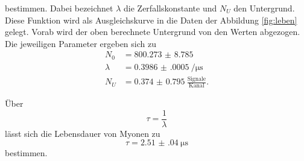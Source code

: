 bestimmen. Dabei bezeichnet $\lambda$ die Zerfallskonstante und $N_U$ den Untergrund. Diese Funktion wird als Ausgleichskurve in die Daten der Abbildung \ref{fig:leben} gelegt. Vorab wird der oben berechnete Untergrund von den Werten abgezogen. Die jeweiligen Parameter ergeben sich zu
\begin{align*}
    N_0 &= \num{800.273(8785)} \\
    \lambda &=  \SI{0.3986(0005)}{\per\micro\s} \\
    N_U &= \num{0.374(0795)} \: \frac{\text{Signale}}{\text{Kanal}} .
\end{align*}


Über 
\begin{equation}
\tau = \frac{1}{\lambda}     
\end{equation}
lässt sich die Lebensdauer von Myonen zu
\begin{equation}
    \tau = \SI{ 2.51(04)}{\micro\s}
\end{equation}
bestimmen.


%
